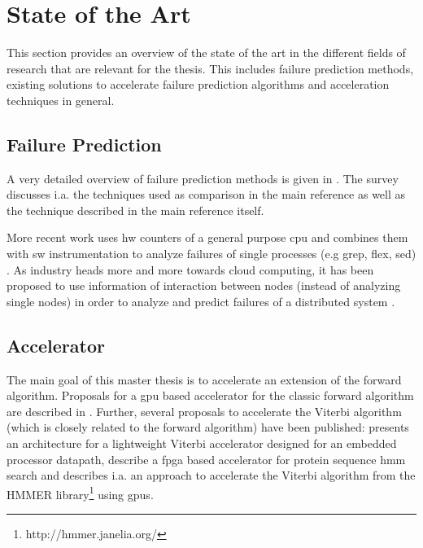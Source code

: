 \documentclass[mscthesis]{usiinfthesis}
\begin{document}
\chapter{State of the Art}
\label{ch:art}
\glsresetall %

This section provides an overview of the state of the art in the different
fields of research that are relevant for the thesis. This includes failure
prediction methods, existing solutions to accelerate failure prediction
algorithms and acceleration techniques in general.

\section{Failure Prediction}
\label{ch:art_pred}
A very detailed overview of failure prediction methods is given in
\cite{ACM10_Salfner}. The survey discusses i.a. the techniques used as
comparison in the main reference
\cite{lin88,IEEE90_lin,ICDM02_Vilalta,domeniconi02} as well as the technique
described in the main reference \cite{salfner08} itself.

More recent work uses \gls{hw} counters of a general purpose \gls{cpu} and
combines them with \gls{sw} instrumentation to analyze failures of single
processes (e.g grep, flex, sed) \cite{FSE10_Yilmaz}. As industry heads more and
more towards cloud computing, it has been proposed to use information of
interaction between nodes (instead of analyzing single nodes) in order to
analyze and predict failures of a distributed system
\cite{IEEE12_Salfner,DSN10_Oliner}.

\section{Accelerator}
\label{ch:art_acc}

The main goal of this master thesis is to accelerate an extension of the
forward algorithm. Proposals for a \gls{gpu} based accelerator for the classic
forward algorithm are described in \cite{neumann11,liu09}. Further, several
proposals to accelerate the Viterbi algorithm (which is closely related to the
forward algorithm) have been published: \cite{ASAP12_Azhar} presents an
architecture for a lightweight Viterbi accelerator designed for an embedded
processor datapath, \cite{IPDPS07_Jacob,ICS06_Maddimsetty,IPDPS07_Oliver}
describe a \gls{fpga} based accelerator for protein sequence \gls{hmm} search
and \cite{IPDPS09_Walters} describes i.a. an approach to accelerate the Viterbi
algorithm from the HMMER library\footnote{http://hmmer.janelia.org/} using
\glspl{gpu}.
\end{document}
